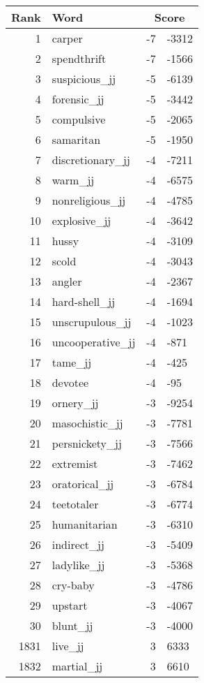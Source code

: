\begin{longtable}[!htbp]{| rlr@{.}l |}
    \hline
    \textbf{Rank} & \textbf{Word} & \multicolumn{2}{c|}{\textbf{Score}} \\
    \hline
    \endhead
    1 & carper & -7 & -3312 \\
    2 & spendthrift & -7 & -1566 \\
    3 & suspicious\_jj & -5 & -6139 \\
    4 & forensic\_jj & -5 & -3442 \\
    5 & compulsive & -5 & -2065 \\
    6 & samaritan & -5 & -1950 \\
    7 & discretionary\_jj & -4 & -7211 \\
    8 & warm\_jj & -4 & -6575 \\
    9 & nonreligious\_jj & -4 & -4785 \\
    10 & explosive\_jj & -4 & -3642 \\
    11 & hussy & -4 & -3109 \\
    12 & scold & -4 & -3043 \\
    13 & angler & -4 & -2367 \\
    14 & hard-shell\_jj & -4 & -1694 \\
    15 & unscrupulous\_jj & -4 & -1023 \\
    16 & uncooperative\_jj & -4 & -871 \\
    17 & tame\_jj & -4 & -425 \\
    18 & devotee & -4 & -95 \\
    19 & ornery\_jj & -3 & -9254 \\
    20 & masochistic\_jj & -3 & -7781 \\
    21 & persnickety\_jj & -3 & -7566 \\
    22 & extremist & -3 & -7462 \\
    23 & oratorical\_jj & -3 & -6784 \\
    24 & teetotaler & -3 & -6774 \\
    25 & humanitarian & -3 & -6310 \\
    26 & indirect\_jj & -3 & -5409 \\
    27 & ladylike\_jj & -3 & -5368 \\
    28 & cry-baby & -3 & -4786 \\
    29 & upstart & -3 & -4067 \\
    30 & blunt\_jj & -3 & -4000 \\
    1831 & live\_jj & 3 & 6333 \\
    1832 & martial\_jj & 3 & 6610 \\

\end{longtable}
